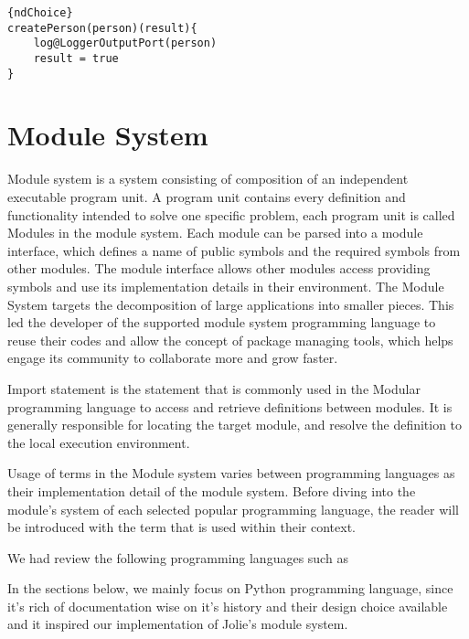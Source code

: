 \begin{listing}[h]
    \lstset{language=Jolie,
        style=codeStyle,
        numbers=left,
        firstnumber=1
    }
    \begin{lstlisting}[frame=tlrb]{ndChoice}
createPerson(person)(result){
    log@LoggerOutputPort(person)
    result = true
}
\end{lstlisting}
\end{listing}

\FloatBarrier






\section{Module System}

Module system is a system consisting of composition of an independent executable program unit. A program unit contains every definition and functionality intended to solve one specific problem, each program unit is called Modules in the module system. Each module can be parsed into a module interface, which defines a name of public symbols and the required symbols from other modules. The module interface allows other modules access providing symbols and use its implementation details in their environment. The Module System targets the decomposition of large applications into smaller pieces. This led the developer of the supported module system programming language to reuse their codes and allow the concept of package managing tools, which helps engage its community to collaborate more and grow faster.

Import statement is the statement that is commonly used in the Modular programming language to access and retrieve definitions between modules. It is generally responsible for locating the target module, and resolve the definition to the local execution environment.

Usage of terms in the Module system varies between programming languages as their implementation detail of the module system. Before diving into the module's system of each selected popular programming language, the reader will be introduced with the term that is used within their context.

We had review the following programming languages such as 

In the sections below, we mainly focus on Python programming language, since it's rich of documentation wise on it's history and their design choice available and it inspired our implementation of Jolie's module system.


